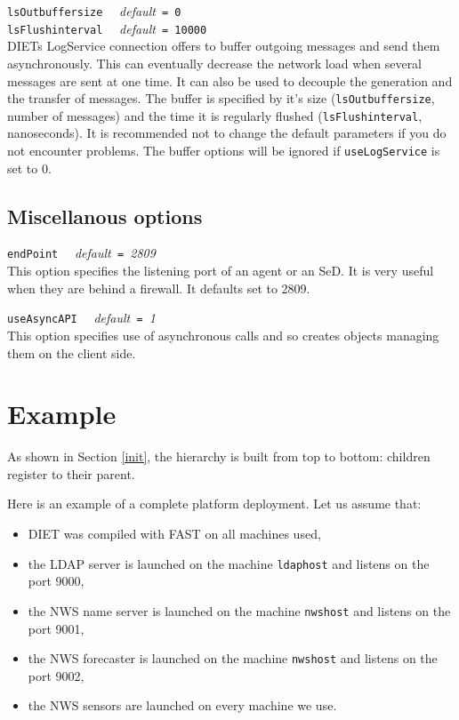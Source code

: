 \noindent
\texttt{lsOutbuffersize} \ \ \emph{default}\texttt{ = 0}\\
\noindent
\texttt{lsFlushinterval} \ \ \emph{default}\texttt{ = 10000}\\
DIETs LogService connection offers to buffer outgoing messages
and send them asynchronously. This can eventually decrease the network
load when several messages are sent at one time. It can also be used
to decouple the generation and the transfer of messages.
The buffer is specified by it's size (\texttt{lsOutbuffersize},
number of messages) and the time it is regularly flushed
(\texttt{lsFlushinterval}, nanoseconds). It is recommended not
to change the default parameters if you do not encounter
problems. The buffer options will be ignored if \texttt{useLogService}
is set to 0.

\subsection{Miscellanous options}

\noindent
\texttt{endPoint} \ \ \emph{default}\texttt{ = }\emph{2809}\\
This option specifies the listening port of an agent or an SeD. It is very
useful when they are behind a firewall. It defaults set to 2809. 

\noindent
\texttt{useAsyncAPI} \ \ \emph{default}\texttt{ = }\emph{1}\\
This option specifies use of asynchronous calls and so creates objects managing them on the client side.

\section{Example}
\label{sec:deploy_ex}

As shown in Section \ref{init}, the hierarchy is built from top to
bottom: children register to their parent.

Here is an example of a complete platform deployment. Let us assume that:

\begin{itemize}
\item DIET was compiled with FAST on all machines used,
\item the LDAP server is launched on the machine \texttt{ldaphost} and listens
  on the port 9000,
\item the NWS name server is launched on the machine \texttt{nwshost} and
  listens on the port 9001,
\item the NWS forecaster is launched on the machine \texttt{nwshost} and
  listens on the port 9002,
\item the NWS sensors are launched on every machine we use.
\end{itemize}


